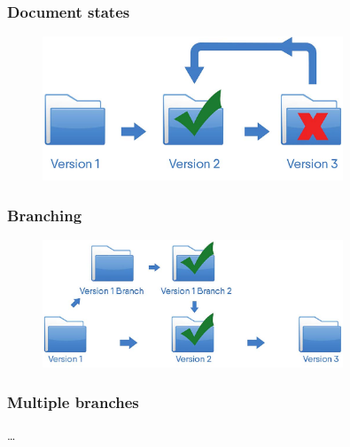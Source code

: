 \begin{frame}
  \frametitle{Document states}
  \begin{figure}[htpb]
      \centering
      \includegraphics[width=0.8\textwidth]{images/singleton-vc.png}
  \end{figure}
\end{frame}

\begin{frame}
    \frametitle{Branching}
    \begin{figure}[htpb]
        \centering
        \includegraphics[width=0.8\textwidth]{images/branching-vc.png}
    \end{figure} 
\end{frame}

\begin{frame}
    \frametitle{Multiple branches}
    \ldots
    
\end{frame}

